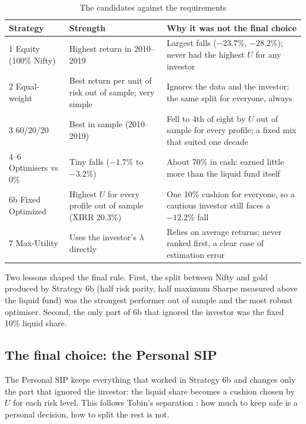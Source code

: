\begin{table}[H]
\centering
\caption{The candidates against the requirements}
\label{tab:choice}
\small
\begin{tabularx}{\textwidth}{@{}l>{\raggedright\arraybackslash}X>{\raggedright\arraybackslash}X@{}}
\toprule
Strategy & Strength & Why it was not the final choice \\
\midrule
1 Equity (100\% Nifty) & Highest return in 2010--2019 & Largest falls ($-23.7\%$, $-28.2\%$); never had the highest $U$ for any investor \\
2 Equal-weight & Best return per unit of risk out of sample; very simple & Ignores the data and the investor: the same \nicefrac13 split for everyone, always \\
3 60/20/20 & Best in sample (2010--2019) & Fell to 4th of eight by $U$ out of sample for every profile; a fixed mix that suited one decade \\
4--6 Optimisers vs 0\% & Tiny falls ($-1.7\%$ to $-3.2\%$) & About 70\% in cash: earned little more than the liquid fund itself \\
6b Fixed Optimized & Highest $U$ for every profile out of sample (XIRR 20.3\%) & One 10\% cushion for everyone, so a cautious investor still faces a $-12.2\%$ fall \\
7 Max-Utility & Uses the investor's $\lambda$ directly & Relies on average returns; never ranked first, a clear case of estimation error \\
\bottomrule
\end{tabularx}
\end{table}

Two lessons shaped the final rule. First, the split between Nifty and gold produced by Strategy 6b
(half risk parity, half maximum Sharpe measured above the liquid fund) was the strongest performer out
of sample and the most robust optimiser. Second, the only part of 6b that ignored the investor was the
fixed 10\% liquid share.

\subsection{The final choice: the Personal SIP}

The Personal SIP keeps everything that worked in Strategy 6b and changes only the part that ignored
the investor: the liquid share becomes a cushion chosen by $U$ for each risk level. This follows
Tobin's separation \citep{tobin1958}: how much to keep safe is a personal decision, how to split the
rest is not.

